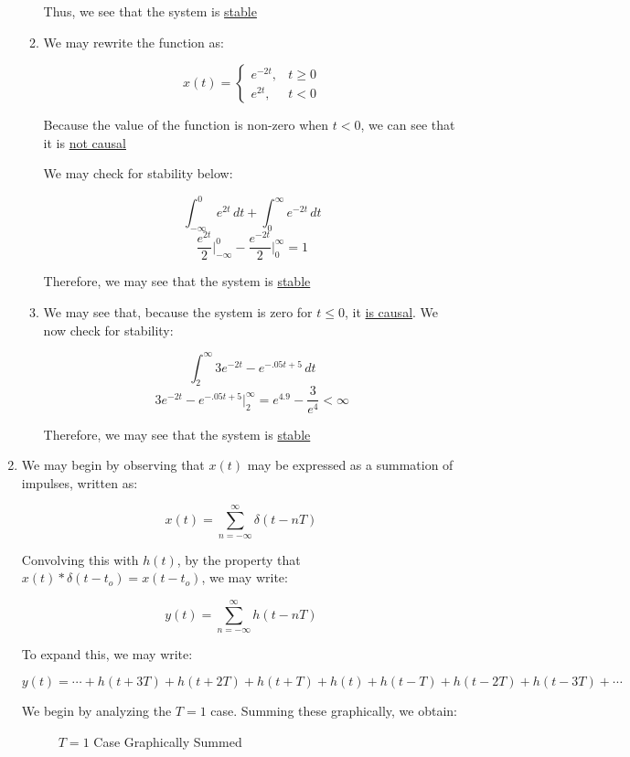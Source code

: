 \begin{enumerate}
\begin{enumerate}
        Thus, we see that the system is \underline{stable}

      \item 

        We may rewrite the function as:

        $$x(t)=\left\{\begin{array}{ll} e^{-2t}, & t\geq0\\ e^{2t}, & t<0\end{array}$$

        Because the value of the function is non-zero when $t<0$, we can see that it is \underline{not causal}

        We may check for stability below:

        $$\int_{-\infty}^{0} e^{2t}\,dt + \int_0^{\infty} e^{-2t}\,dt$$
        $$\frac{e^{2t}}{2}\Big|_{-\infty}^0-\frac{e^{-2t}}{2}\Big|_0^{\infty}=1$$

        Therefore, we may see that the system is \underline{stable}

      \item We may see that, because the system is zero for $t\leq 0$, it \underline{is causal}. We now check for stability:

        $$\int_2^{\infty} 3e^{-2t}-e^{-.05t+5}\,dt$$
        $$3e^{-2t}-e^{-.05t+5}\Big|_2^{\infty}=e^{4.9}-\frac{3}{e^4}<\infty$$

        Therefore, we may see that the system is \underline{stable}

    \end{enumerate}

  \item

    We may begin by observing that $x(t)$ may be expressed as a summation of impulses, written as:

    $$x(t)=\sum_{n=-\infty}^{\infty} \delta(t-nT)$$

    Convolving this with $h(t)$, by the property that $x(t)*\delta(t-t_o)=x(t-t_o)$, we may write:

    $$y(t)=\sum_{n=-\infty}^{\infty} h(t-nT)$$

    To expand this, we may write:

    $$y(t)=\cdots+h(t+3T)+h(t+2T)+h(t+T)+h(t)+h(t-T)+h(t-2T)+h(t-3T)+\cdots$$

    We begin by analyzing the $T=1$ case. Summing these graphically, we obtain:

    \begin{figure}[H]
      \centering
      
      \caption{$T=1$ Case Graphically Summed}
      \label{fig:1}
    \end{figure}


\end{enumerate}
